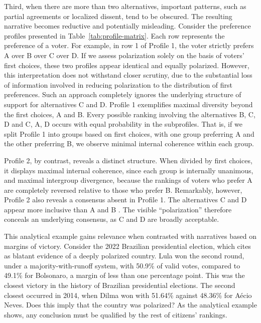 \documentclass[12pt]{article}
\begin{document}
Third, when there are more than two alternatives, important patterns, such as partial agreements or localized dissent, tend to be obscured. The resulting narrative becomes reductive and potentially misleading. Consider the preference profiles presented in Table~\ref{tab:profile-matrix}. Each row represents the preference of a voter. For example, in row 1 of Profile 1, the voter strictly prefers A over B over C over D. If we assess polarization solely on the basis of voters’ first choices, these two profiles appear identical and equally polarized. However, this interpretation does not withstand closer scrutiny, due to the substantial loss of information involved in reducing polarization to the distribution of first preferences. Such an approach completely ignores the underlying structure of support for alternatives C and D. Profile 1 exemplifies maximal diversity beyond the first choices, A and B. Every possible ranking involving the alternatives B, C, D and C, A, D occurs with equal probability in the subprofiles. That is, if we split Profile 1 into groups based on first choices, with one group preferring A and the other preferring B, we observe minimal internal coherence within each group.

Profile 2, by contrast, reveals a distinct structure. When divided by first choices, it displays maximal internal coherence, since each group is internally unanimous, and maximal intergroup divergence, because the rankings of voters who prefer A are completely reversed relative to those who prefer B. Remarkably, however, Profile 2 also reveals a consensus absent in Profile 1. The alternatives C and D appear more inclusive than A and B \parencite{igersheim22_compar_votin_method}. The visible “polarization” therefore conceals an underlying consensus, as C and D are broadly acceptable.

This analytical example gains relevance when contrasted with narratives based on margins of victory. Consider the 2022 Brazilian presidential election, which \textcite{nunes2023biografia} cites as blatant evidence of a deeply polarized country. Lula won the second round, under a majority-with-runoff system, with 50.9\% of valid votes, compared to 49.1\% for Bolsonaro, a margin of less than one percentage point. This was the closest victory in the history of Brazilian presidential elections. The second closest occurred in 2014, when Dilma won with 51.64\% against 48.36\% for Aécio Neves. Does this imply that the country was polarized? As the analytical example shows, any conclusion must be qualified by the rest of citizens’ rankings.
\end{document}
